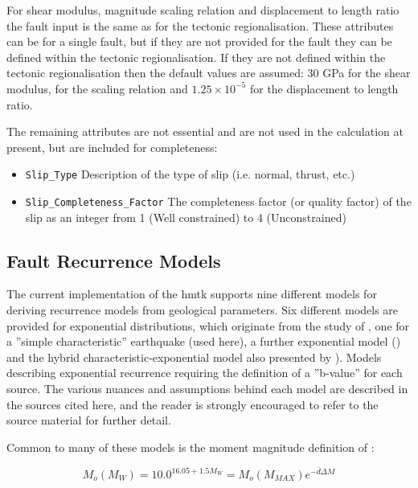 For shear modulus, magnitude scaling relation and displacement to length ratio the fault input is the same as for the tectonic regionalisation. These attributes can be for a single fault, but if they are not provided for the fault they can be defined within the tectonic regionalisation. If they are not defined within the tectonic regionalisation then the default values are assumed: 30 GPa for the shear modulus, \cite{wells1994} for the scaling relation and $1.25\times10^{-5}$ for the displacement to length ratio. 

The remaining attributes are not essential and are not used in the calculation at present, but are included for completeness:
\begin{itemize}
\item \verb=Slip_Type= Description of the type of slip (i.e. normal, thrust, etc.)
\item \verb=Slip_Completeness_Factor= The completeness factor (or quality factor) of the slip as an integer from 1 (Well constrained) to 4 (Unconstrained) 
\end{itemize}




\subsection{Fault Recurrence Models}

The current implementation of the hmtk supports nine different models for deriving recurrence models from geological parameters. Six different models are provided for exponential distributions, which originate from the study of \cite{AndersonLuco1983}, one for a ''simple characteristic'' earthquake (used here), a further exponential model (\cite{YoungsCoppersmith1985}) and the hybrid characteristic-exponential model also presented by \cite{YoungsCoppersmith1985}). Models describing exponential recurrence requiring the definition of a ''b-value'' for each source. The various nuances and assumptions behind each model are described in the sources cited here, and the reader is strongly encouraged to refer to the source material for further detail.

Common to many of these models is the moment magnitude definition of \cite{HanksKanamori1979}:

\begin{equation}
M_o \left( {M_W} \right) = 10.0 ^{16.05 + 1.5 M_W} = M_o \left( {M_{MAX}} \right) e^{-\bar{d} \Delta M}
\end{equation}

